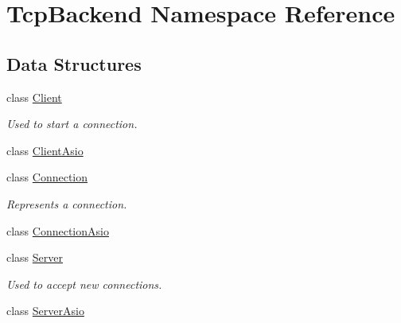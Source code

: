 \hypertarget{namespaceTcpBackend}{}\section{Tcp\+Backend Namespace Reference}
\label{namespaceTcpBackend}
\subsection*{Data Structures}
\begin{DoxyCompactItemize}
\item 
class \hyperlink{classTcpBackend_1_1Client}{Client}
\begin{DoxyCompactList}\small\item\em Used to start a connection. \end{DoxyCompactList}\item 
class \hyperlink{classTcpBackend_1_1ClientAsio}{Client\+Asio}
\item 
class \hyperlink{classTcpBackend_1_1Connection}{Connection}
\begin{DoxyCompactList}\small\item\em Represents a connection. \end{DoxyCompactList}\item 
class \hyperlink{classTcpBackend_1_1ConnectionAsio}{Connection\+Asio}
\item 
class \hyperlink{classTcpBackend_1_1Server}{Server}
\begin{DoxyCompactList}\small\item\em Used to accept new connections. \end{DoxyCompactList}\item 
class \hyperlink{classTcpBackend_1_1ServerAsio}{Server\+Asio}
\end{DoxyCompactItemize}
